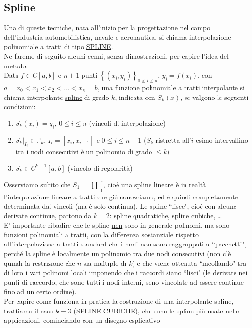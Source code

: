 \documentclass[12pt,a4paper]{article}
\newcommand{\inter}{\begin{matrix}\prod\end{matrix}}
\begin{document}
\subsection{Spline}
Una di queste tecniche, nata all'inizio per la progettazione nel campo dell'industria automobilistica, navale e aeronautica, si chiama interpolazione polinomiale a tratti di tipo \uline{SPLINE}.\\
Ne faremo di seguito alcuni cenni, senza dimostrazioni, per capire l'idea del metodo. \\
Data $f \in C[a,b]$ e $n+1$ punti $\left\{ (x_i,y_i) \right\}_{0 \leq i \leq n}$, $y_i=f(x_i)$, con $a=x_0 < x_1 < x_2 <\dots<x_n=b$, una funzione polinomiale a tratti interpolante si chiama interpolante \uline{spline} di grado $k$, indicata con $S_k(x)$, se valgono le seguenti condizioni:
\begin{enumerate}
    \item $S_k(x_i)=y_i$, $0 \leq i \leq n$ (vincoli di interpolazione)
    \item $S_k \vert_{I_i} \in \mathbb{P}_k$, $I_i=[x_i,x_{i+1}]$ e $0 \leq i \leq n-1$ ($S_k$ ristretta all'$i$-esimo intervallino tra i nodi consecutivi è un polinomio di grado $\leq  k$)
    \item $S_k \in C^{k-1}[a,b]$ (vincolo di regolarità)
\end{enumerate}
Osserviamo subito che $S_1=\inter_1^c$, cioè una spline lineare è in realtà l'interpolazione lineare a tratti che già conosciamo, ed è quindi completamente determinata dai vincoli (ma è solo continua). Le spline ``lisce", cioè con alcune derivate continue, partono da $k=2$: spline quadratiche, spline cubiche, \dots \\
E' importante ribadire che le spline \uline{non} sono in generale polinomi, ma sono funzioni polinomiali a tratti, con la differenza sostanziale rispetto all'interpolazione a tratti standard che i nodi non sono raggruppati a ``pacchetti", perché la spline è localmente un polinomio tra due nodi consecutivi (non c'è quindi la restrizione che $n$ sia multiplo di $k$) e che viene ottenuta ``incollando" tra di loro i vari polinomi locali imponendo che i raccordi siano ``lisci" (le derivate nei punti di raccordo, che sono tutti i nodi interni, sono vincolate ad essere continue fino ad un certo ordine). \\ Per capire come funziona in pratica la costruzione di una interpolante spline, trattiamo il caso $k=3$ (SPLINE CUBICHE), che sono le spline più usate nelle applicazioni, cominciando con un disegno esplicativo
\end{document}
